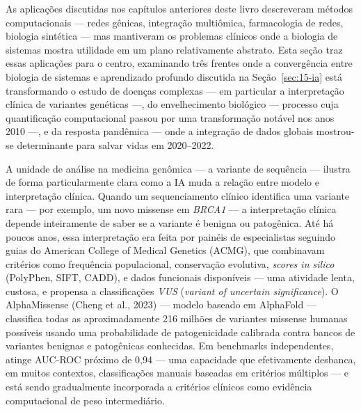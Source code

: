 As aplicações discutidas nos capítulos anteriores deste livro descreveram métodos computacionais --- redes gênicas, integração multiômica, farmacologia de redes, biologia sintética --- mas mantiveram os problemas clínicos onde a biologia de sistemas mostra utilidade em um plano relativamente abstrato. Esta seção traz essas aplicações para o centro, examinando três frentes onde a convergência entre biologia de sistemas e aprendizado profundo discutida na Seção~\ref{sec:15-ia} está transformando o estudo de doenças complexas --- em particular a interpretação clínica de variantes genéticas ---, do envelhecimento biológico --- processo cuja quantificação computacional passou por uma transformação notável nos anos 2010 ---, e da resposta pandêmica --- onde a integração de dados globais mostrou-se determinante para salvar vidas em 2020--2022.



A unidade de análise na medicina genômica --- a variante de sequência --- ilustra de forma particularmente clara como a IA muda a relação entre modelo e interpretação clínica. Quando um sequenciamento clínico identifica uma variante rara --- por exemplo, um novo missense em \emph{BRCA1} --- a interpretação clínica depende inteiramente de saber se a variante é benigna ou patogênica. Até há poucos anos, essa interpretação era feita por painéis de especialistas seguindo guias do American College of Medical Genetics (ACMG), que combinavam critérios como frequência populacional, conservação evolutiva, \emph{scores in silico} (PolyPhen, SIFT, CADD), e dados funcionais disponíveis --- uma atividade lenta, custosa, e propensa a classificações \emph{VUS} (\emph{variant of uncertain significance}). O AlphaMissense (Cheng et al., 2023) --- modelo baseado em AlphaFold --- classifica todas as aproximadamente 216 milhões de variantes missense humanas possíveis usando uma probabilidade de patogenicidade calibrada contra bancos de variantes benignas e patogênicas conhecidas. Em benchmarks independentes, atinge AUC-ROC próximo de 0{,}94 --- uma capacidade que efetivamente desbanca, em muitos contextos, classificações manuais baseadas em critérios múltiplos --- e está sendo gradualmente incorporada a critérios clínicos como evidência computacional de peso intermediário.



